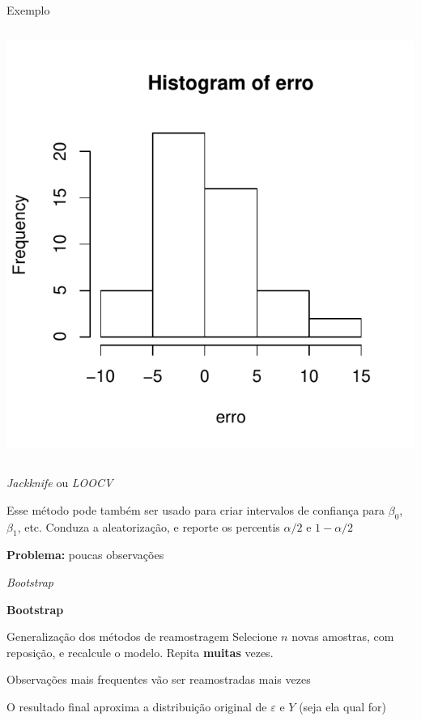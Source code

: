 \documentclass{beamer}\usepackage[]{graphicx}\usepackage[]{color}
\newenvironment{knitrout}{}{} %
\renewenvironment{knitrout}{\setlength{\topsep}{0mm}}{}
\begin{document}
\begin{frame}[fragile]{Exemplo}
\begin{columns}[c]
\begin{knitrout}
\includegraphics[width=.7\linewidth]{figure/v12-2} 

\end{knitrout}

\end{columns}

\end{frame}


\begin{frame}{\emph{Jackknife} ou \emph{LOOCV}}

Esse método pode também ser usado para criar intervalos de confiança para $\beta _0$, $\beta _1$, etc. \pause
\vfill
Conduza a aleatorização, e reporte os percentis $\alpha/2$ e $1-\alpha/2$ \pause

\vfill

\textbf{Problema:} poucas observações

\end{frame}


\begin{frame}{\emph{Bootstrap}}

\textbf{Bootstrap}

Generalização dos métodos de reamostragem \pause
\vfill
Selecione $n$ novas amostras, com reposição, e recalcule o modelo. Repita \textbf{muitas} vezes. \pause

\vfill

Observações mais frequentes vão ser reamostradas mais vezes \pause

\vfill

O resultado final aproxima a distribuição original de $\varepsilon$ e $Y$ (seja ela qual for)

\end{frame}
\end{document}

